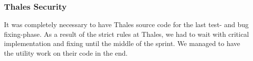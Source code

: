 \subsubsection{Thales Security}
It was completely necessary to have Thales source code for the last test- and bug fixing-phase. As a result of the strict rules at Thales, we had to wait with critical implementation and fixing until the middle of the sprint. We managed to have the utility work on their code in the end.
